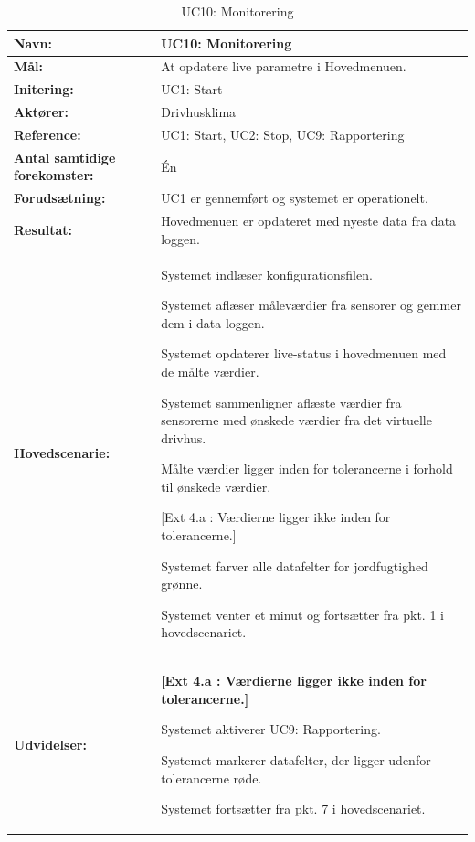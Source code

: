 \begin{table}[h]
\begin{tabularx}{\textwidth}{| >{\raggedright\arraybackslash}p{3.3 cm} | >{\raggedright\arraybackslash}X |} \hline

\textbf{Navn:} 						& UC10: Monitorering\\ \hline
\textbf{Mål:}						& At opdatere live parametre i Hovedmenuen. \\ \hline
\textbf{Initering:}					& UC1: Start \\ \hline
\textbf{Aktører:} 					& Drivhusklima \\ \hline
\textbf{Reference:} 					& UC1: Start, UC2: Stop, UC9: Rapportering \\ \hline
\textbf{Antal samtidige forekomster:} & Én \\ \hline
\textbf{Forudsætning:} 				& UC1 er gennemført og systemet er operationelt. \\ \hline
\textbf{Resultat:}					& Hovedmenuen er opdateret med nyeste data fra data loggen. \\ \hline
\textbf{Hovedscenarie:}				& 

\begin{packed_enum}
\item Systemet indlæser konfigurationsfilen.
\item Systemet aflæser måleværdier fra sensorer og gemmer dem i data loggen. 
\item Systemet opdaterer live-status i hovedmenuen med de målte værdier.
\item Systemet sammenligner aflæste værdier fra sensorerne med ønskede værdier fra det virtuelle drivhus.
\item Målte værdier ligger inden for tolerancerne i forhold til ønskede værdier.
	\begin{packed_item}\itemsep1pt \parskip0pt \parsep0pt
	\item {[}Ext 4.a : Værdierne ligger ikke inden for tolerancerne.{]}
	\end{packed_item}
\item Systemet farver alle datafelter for jordfugtighed grønne.
\item Systemet venter et minut og fortsætter fra pkt. 1 i hovedscenariet.
\end{packed_enum} \\ \hline
\textbf{Udvidelser:}				&  
\textbf{{[}Ext 4.a : Værdierne ligger ikke inden for tolerancerne.{]}}
	\begin{packed_enum}\itemsep1pt \parskip0pt \parsep0pt
	\item Systemet aktiverer UC9: Rapportering.
	\item Systemet markerer datafelter, der ligger udenfor tolerancerne røde.
	\item Systemet fortsætter fra pkt. 7 i hovedscenariet.
	\end{packed_enum}
\\ \hline
\end{tabularx}
\caption{UC10: Monitorering}
\label{tbl:UC10}
\end{table}


